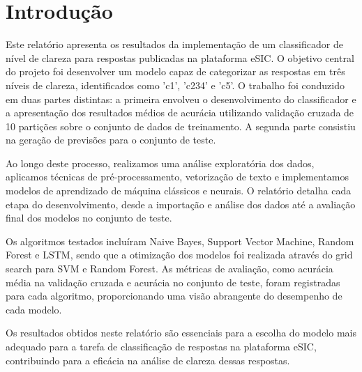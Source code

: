 \newpage
\section{Introdução}
\label{sec:introducao}

Este relatório apresenta os resultados da implementação de um classificador de nível de clareza para respostas publicadas na plataforma eSIC. O objetivo central do projeto foi desenvolver um modelo capaz de categorizar as respostas em três níveis de clareza, identificados como 'c1', 'c234' e 'c5'. O trabalho foi conduzido em duas partes distintas: a primeira envolveu o desenvolvimento do classificador e a apresentação dos resultados médios de acurácia utilizando validação cruzada de 10 partições sobre o conjunto de dados de treinamento. A segunda parte consistiu na geração de previsões para o conjunto de teste.

Ao longo deste processo, realizamos uma análise exploratória dos dados, aplicamos técnicas de pré-processamento, vetorização de texto e implementamos modelos de aprendizado de máquina clássicos e neurais. O relatório detalha cada etapa do desenvolvimento, desde a importação e análise dos dados até a avaliação final dos modelos no conjunto de teste.

Os algoritmos testados incluíram Naive Bayes, Support Vector Machine, Random Forest e LSTM, sendo que a otimização dos modelos foi realizada através do grid search para SVM e Random Forest. As métricas de avaliação, como acurácia média na validação cruzada e acurácia no conjunto de teste, foram registradas para cada algoritmo, proporcionando uma visão abrangente do desempenho de cada modelo.

Os resultados obtidos neste relatório são essenciais para a escolha do modelo mais adequado para a tarefa de classificação de respostas na plataforma eSIC, contribuindo para a eficácia na análise de clareza dessas respostas.

